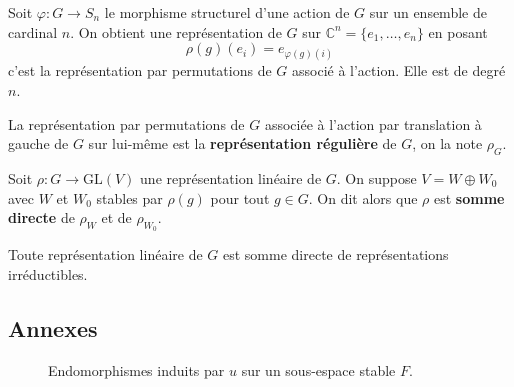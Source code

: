 	\begin{example}
		Soit $\varphi : G \rightarrow S_n$ le morphisme structurel d'une action de $G$ sur un ensemble de cardinal $n$. On obtient une représentation de $G$ sur $\mathbb{C}^n = \{ e_1, \dots, e_n \}$ en posant
		\[ \rho(g)(e_i) = e_{\varphi(g)(i)} \]
		c'est la représentation par permutations de $G$ associé à l'action. Elle est de degré $n$.
	\end{example}

	\begin{definition}
		La représentation par permutations de $G$ associée à l'action par translation à gauche de $G$ sur lui-même est la \textbf{représentation régulière} de $G$, on la note $\rho_G$.
	\end{definition}

	\begin{definition}
		Soit $\rho : G \rightarrow \mathrm{GL}(V)$ une représentation linéaire de $G$. On suppose $V = W \oplus W_0$ avec $W$ et $W_0$ stables par $\rho(g)$ pour tout $g \in G$. On dit alors que $\rho$ est \textbf{somme directe} de $\rho_W$ et de $\rho_{W_0}$.
	\end{definition}


	\begin{theorem}[Maschke]
		Toute représentation linéaire de $G$ est somme directe de représentations irréductibles.
	\end{theorem}

	\newpage

	\subsection*{Annexes}


	\begin{figure}[h]
		\begin{center}
		\end{center}
		\caption{Endomorphismes induits par $u$ sur un sous-espace stable $F$.}
	\end{figure}

